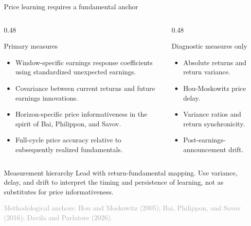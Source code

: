 \documentclass[aspectratio=169,10pt]{beamer}
\newcommand{\source}[1]{\vfill{\scriptsize\textcolor{DarkGray}{#1}}}
\newcommand{\tightitems}{\setlength\itemsep{0.11cm}\setlength\parskip{0pt}}
\begin{document}
\begin{frame}[t,shrink=2]{Price learning requires a fundamental anchor}
\begin{columns}[T,onlytextwidth]
  \begin{column}{0.48\textwidth}
    \begin{block}{Primary measures}
    \small
    \begin{itemize}\tightitems
      \item Window-specific earnings response coefficients using standardized unexpected earnings.
      \item Covariance between current returns and future earnings innovations.
      \item Horizon-specific price informativeness in the spirit of Bai, Philippon, and Savov.
      \item Full-cycle price accuracy relative to subsequently realized fundamentals.
    \end{itemize}
    \end{block}
  \end{column}
  \begin{column}{0.48\textwidth}
    \begin{block}{Diagnostic measures only}
    \small
    \begin{itemize}\tightitems
      \item Absolute returns and return variance.
      \item Hou-Moskowitz price delay.
      \item Variance ratios and return synchronicity.
      \item Post-earnings-announcement drift.
    \end{itemize}
    \end{block}
  \end{column}
\end{columns}

\begin{exampleblock}{Measurement hierarchy}
Lead with return-fundamental mapping. Use variance, delay, and drift to interpret the timing and persistence of learning, not as substitutes for price informativeness.
\end{exampleblock}

\source{Methodological anchors: Hou and Moskowitz (2005); Bai, Philippon, and Savov (2016); Davila and Parlatore (2026).}
\end{frame}
\end{document}
